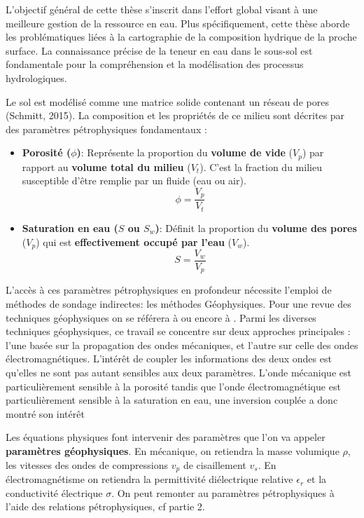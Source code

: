 

L'objectif général de cette thèse s'inscrit dans l'effort global visant à une meilleure gestion de la ressource en eau. Plus spécifiquement, cette thèse aborde les problématiques liées à la cartographie de la composition hydrique de la proche surface. La connaissance précise de la teneur en eau dans le sous-sol est fondamentale pour la compréhension et la modélisation des processus hydrologiques.\par 

Le sol est modélisé comme une matrice solide contenant un réseau de pores (Schmitt, 2015). La composition et les propriétés de ce milieu sont décrites par des paramètres pétrophysiques fondamentaux :

\begin{itemize}
    \item \textbf{Porosité ($\phi$)}: Représente la proportion du \textbf{volume de vide} ($V_p$) par rapport au \textbf{volume total du milieu} ($V_t$). C'est la fraction du milieu susceptible d'être remplie par un fluide (eau ou air).
    $$ \phi = \frac{V_p}{V_t} $$

    \item \textbf{Saturation en eau ($S$ ou $S_w$)}: Définit la proportion du \textbf{volume des pores} ($V_p$) qui est \textbf{effectivement occupé par l'eau} ($V_w$).
    \vspace{0.2cm}
    $$ S = \frac{V_w}{V_p} $$
\end{itemize}

L'accès à ces paramètres pétrophysiques en profondeur nécessite l'emploi de méthodes de sondage indirectes: les méthodes Géophysiques. Pour une revue des techniques géophysiques on se référera à \cite{Ruiz_Linde2018} ou encore à \cite{LOISEAU2023}. Parmi les diverses techniques géophysiques, ce travail se concentre sur deux approches principales : l'une basée sur la propagation des ondes mécaniques, et l'autre sur celle des ondes électromagnétiques. L'intérêt de coupler les informations des deux ondes est qu'elles ne sont pas autant sensibles aux deux paramètres. L'onde mécanique est particulièrement sensible à la porosité tandis que l'onde électromagnétique est particulièrement sensible à la saturation en eau, une inversion couplée a donc montré son intérêt \cite{Gao} \cite{didie2024}  \par

Les équations physiques font intervenir des paramètres que l'on va appeler \textbf{paramètres géophysiques}. En mécanique, on retiendra la masse volumique $\rho$, les vitesses des ondes de compressions $v_p$ de cisaillement $v_s$. En électromagnétisme on retiendra la permittivité diélectrique relative $\epsilon_r$ et la conductivité électrique $\sigma$. On peut remonter au paramètres pétrophysiques à l'aide des relations pétrophysiques, cf partie 2.  


